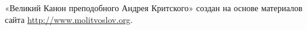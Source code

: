 \vspace*{0.2\paperheight}

\renewcommand\myid{announce}

\begin{identity}

«Великий Канон преподобного Андрея Критского» создан на основе материалов сайта \url{http://www.molitvoslov.org}.

\end{identity}

